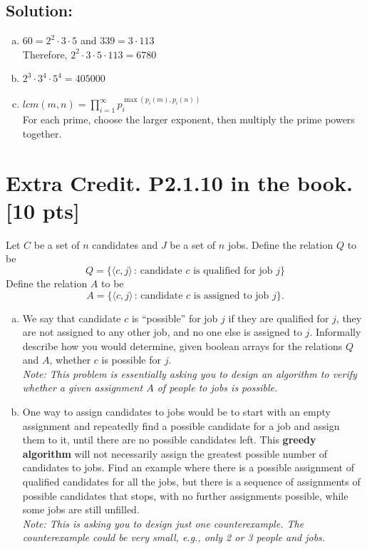 \documentclass[12pt]{article}
\begin{document}
	\subsection*{\textbf{Solution:}}
	\begin{enumerate}[(a)]
		\item $60=2^{2}\cdot3\cdot5$ and $339=3\cdot113$\\
			Therefore, $2^{2}\cdot3\cdot5\cdot113=6780$

		\item $2^{3}\cdot3^{4}\cdot5^{4}=405000$

		\item $lcm(m,n)=\prod_{i=1}^{\infty}p_{i}^{\max(p_i(m),p_i(n))}$ \\
			For each prime, choose the larger exponent, then multiply the prime powers
			together.
	\end{enumerate}

	\newpage

	\section*{\textbf{Extra Credit. P2.1.10 in the book.} [10 pts]}
	Let $C$ be a set of $n$ candidates and $J$ be a set of $n$ jobs. Define the
	relation $Q$ to be
	\[
		Q = \{\langle c, j\rangle \,:\, \mbox{candidate $c$ is qualified for job $j$}
		\}
	\]
	Define the relation $A$ to be
	\[
		A = \{\langle c, j\rangle \,:\, \mbox{candidate $c$ is assigned to job $j$}\}
		.
	\]
	\begin{enumerate}[(a)]
		\item We say that candidate $c$ is “possible” for job $j$ if they are qualified
			for $j$, they are not assigned to any other job, and no one else is assigned
			to $j$. Informally describe how you would determine, given boolean arrays for
			the relations $Q$ and $A$, whether $c$ is possible for $j$.\\
			{\em \small Note: This problem is essentially asking you to design an algorithm to {\em verify} whether a given assignment $A$ of people to jobs is possible.}

		\item One way to assign candidates to jobs would be to start with an empty assignment
			and repeatedly find a possible candidate for a job and assign them to it,
			until there are no possible candidates left. This \textbf{greedy algorithm}
			will not necessarily assign the greatest possible number of candidates to
			jobs. Find an example where there is a possible assignment of qualified candidates
			for all the jobs, but there is a sequence of assignments of possible
			candidates that stops, with no further assignments possible, while some
			jobs are still unfilled.\\
			{\em \small Note: This is asking you to design just {\em one} counterexample. The counterexample could be very small, e.g., only 2 or 3 people and jobs.}
	\end{enumerate}
\end{document}
